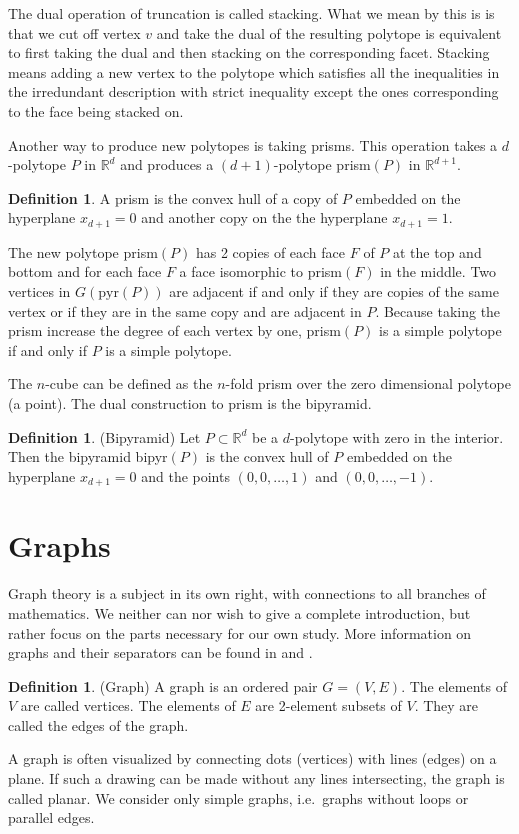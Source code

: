 \documentclass[a4paper,12pt]{book}
\theoremstyle{plain}
\theoremstyle{definition}
\newtheorem{definition}[theorem]{Definition}
\begin{document}
The dual operation of truncation is called stacking. What we mean by this is is that we cut off vertex $v$
and take the dual of the resulting polytope is equivalent to first taking the dual and then stacking on the
corresponding facet.
Stacking means adding a new vertex to the polytope which satisfies all the 
inequalities in the irredundant description with strict inequality except the 
ones corresponding to the face being stacked on.

Another way to produce new polytopes is taking prisms. This operation takes a 
$d$-polytope $P$ in $\mathbb{R}^d$ and produces a $(d+1)$-polytope prism$(P)$ in 
$\mathbb{R}^{d+1}$. 
\begin{definition}
 A prism is the convex hull of a copy of $P$ embedded on the hyperplane 
$x_{d+1} = 0$ and another copy on the the hyperplane $x_{d+1} = 1$.
\end{definition}

 The new polytope prism$(P)$ has 2 copies of 
each face $F$ of $P$ at the top and bottom and for each face $F$ a face isomorphic to 
prism$(F)$ in the middle. Two vertices in $G(\text{pyr}(P))$ are adjacent if and only if
they are copies of the same vertex or if they are in the same copy and are 
adjacent in $P$. Because taking the prism increase the degree of each vertex by one, prism$(P)$ 
is a simple polytope if and only if $P$ is a simple polytope.


The $n$-cube can be defined as the $n$-fold 
prism over the zero dimensional polytope (a point). The dual construction to prism 
is the bipyramid. 
\begin{definition}
 (Bipyramid) Let $P\subset \mathbb{R}^d$ be a $d$-polytope with zero in the 
interior. Then the bipyramid bipyr$(P)$ is the convex hull of $P$ embedded on 
the hyperplane $x_{d+1} = 0$ and the points $(0,0,\dots, 1)$ and $(0,0,\dots, 
-1)$.
\end{definition}


\section{Graphs}

Graph theory is a subject in its own right, with connections to all branches 
of mathematics. We neither can nor wish to give a complete introduction, but
rather focus on the parts necessary for our own study. More information on graphs
and their separators can be found in \cite{spectra} and \cite{Rama}.

\begin{definition}
(Graph) A graph is an ordered pair $G=(V,E)$. The elements of $V$ are called 
vertices. The elements of $E$ are 2-element subsets of $V$. They are called 
the edges of the graph. 
\end{definition}
A graph is often visualized by connecting dots (vertices) with lines (edges) on a plane. 
If such a drawing can be made without any lines intersecting, the graph is called
planar.
We consider only simple graphs, i.e.\ graphs without loops or parallel 
edges.
\end{document}
